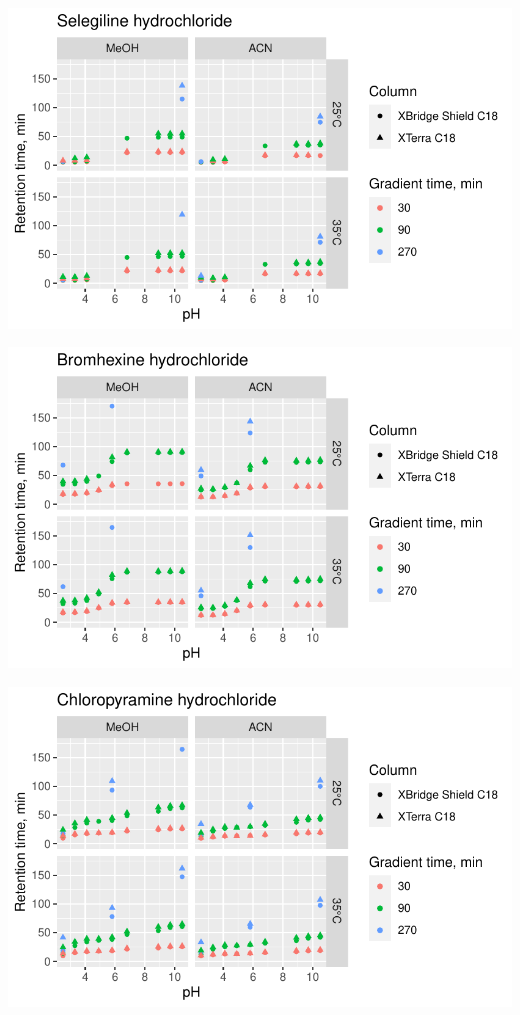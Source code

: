 \documentclass[
  letterpaper,
  DIV=11,
  numbers=noendperiod]{scrreprt}
\begin{document}
\includegraphics{index_files/figure-pdf/unnamed-chunk-4-84.pdf}

\includegraphics{index_files/figure-pdf/unnamed-chunk-4-85.pdf}

\includegraphics{index_files/figure-pdf/unnamed-chunk-4-86.pdf}
\end{document}
